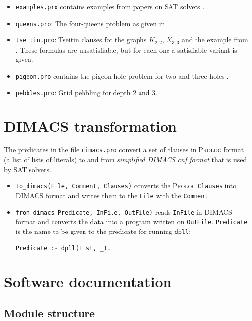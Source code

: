 \documentclass[11pt]{article}
\newcommand*{\p}[1]{\textup{\texttt{#1}}}
\newcommand*{\pl}{\textsc{Prolog}}
\begin{document}
\begin{itemize}
\item \p{examples.pro} contains examples from papers on SAT
solvers \cite{mz,mlm,ms}.

\item \p{queens.pro}: The four-queens problem as given in
\cite[Section 6.4]{mlcs}.

\item \p{tseitin.pro}: Tseitin clauses for the graphs $K_{2,2}$,
$K_{3,3}$ and the example from \cite[Section 4.5]{mlcs}. These formulas
are unsatisfiable, but for each one a satisfiable variant is given.

\item \p{pigeon.pro} contains the pigeon-hole problem for
two and three holes \cite[Exercise 6.4]{mlcs}.

\item \p{pebbles.pro}: Grid pebbling for depth 2 and 3.
\end{itemize}


\section{DIMACS transformation}

The predicates in the file \p{dimacs.pro} convert a set of clauses in
\pl{} format (a list of lists of literals) to and from \emph{simplified
DIMACS cnf format} that is used by SAT solvers.
\begin{itemize}
\item \p{to\_dimacs(File, Comment, Clauses)} converts the \pl{}
\p{Clauses} into DIMACS format and writes them to the \p{File} with the
\p{Comment}.
\item \p{from\_dimacs(Predicate, InFile, OutFile)} reads \p{InFile} in
DIMACS format and converts the data into a program written on
\p{OutFile}. \p{Predicate} is the name to be given to the predicate for
running \p{dpll}:
\begin{verbatim}
Predicate :- dpll(List, _).
\end{verbatim}
\end{itemize}

\newpage

\section{Software documentation}

\subsection{Module structure}
\end{document}
